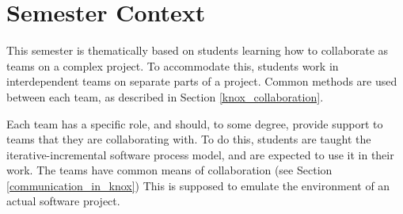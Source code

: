 \section{Semester Context}
This semester is thematically based on students learning how to collaborate as teams on a complex project. 
To accommodate this, students work in interdependent teams on separate parts of a project. 
Common methods are used between each team, as described in Section \ref{knox_collaboration}. 

Each team has a specific role, and should, to some degree, provide support to teams that they are collaborating with.
To do this, students are taught the iterative-incremental software process model\cite{SoftwareProcessModels}, and are expected to use it in their work. The teams have common means of collaboration (see Section \ref{communication_in_knox})
This is supposed to emulate the environment of an actual software project. 


% 



% 

